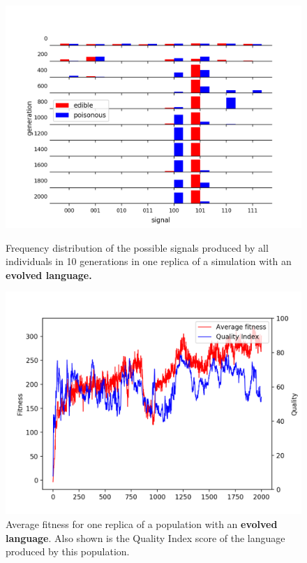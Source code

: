 \documentclass[12pt,a4paper,twoside,openright]{report}
\begin{document}
\begin{figure}[t]
   \centering
   \begin{minipage}{0.49\textwidth}
          \centering
          \captionsetup{width=.9\linewidth}
          \includegraphics[width=1.\linewidth]{results/language.png}
          \caption{Frequency distribution of the possible signals produced by all individuals in 10 generations in one replica of a simulation with an \bf{evolved language}.}
          \label{fig:language-evolved3}
   \end{minipage}
   \begin{minipage}{0.49\textwidth}
          \centering
          \captionsetup{width=.9\linewidth}
          \includegraphics[width=1.\linewidth]{results/correlation.png}
          \caption{Average fitness for one replica of a population with an {\bf evolved language}. Also shown is the Quality Index score of the language produced by this population.}
          \label{fig:correlation}
   \end{minipage}
\end{figure}
\end{document}
